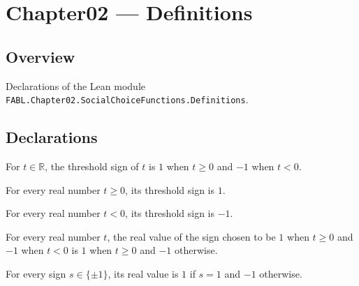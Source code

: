 \chapter{Chapter02 — Definitions}
\section{Overview}

Declarations of the Lean module \texttt{FABL.Chapter02.SocialChoiceFunctions.Definitions}.

\section{Declarations}

\begin{definition}
\label{FABL.thresholdSign}
\leanok
{}
For $t\in\mathbb R$, the threshold sign of $t$ is $1$ when $t\ge 0$ and $-1$ when $t<0$.
\end{definition}

\begin{theorem}
\label{FABL.thresholdSign_of_nonneg}
\leanok
{}
For every real number $t\ge 0$, its threshold sign is $1$.
\end{theorem}

\begin{theorem}
\label{FABL.thresholdSign_of_neg}
\leanok
{}
For every real number $t<0$, its threshold sign is $-1$.
\end{theorem}

\begin{theorem}
\label{FABL.signValue_thresholdSign}
\leanok
{}
For every real number $t$, the real value of the sign chosen to be $1$ when $t\ge 0$ and
$-1$ when $t<0$ is $1$ when $t\ge 0$ and $-1$ otherwise.
\end{theorem}

\begin{theorem}
\label{FABL.signValue_eq_ite}
\leanok
{}
For every sign $s\in\{\pm1\}$, its real value is $1$ if $s=1$ and $-1$ otherwise.
\end{theorem}

